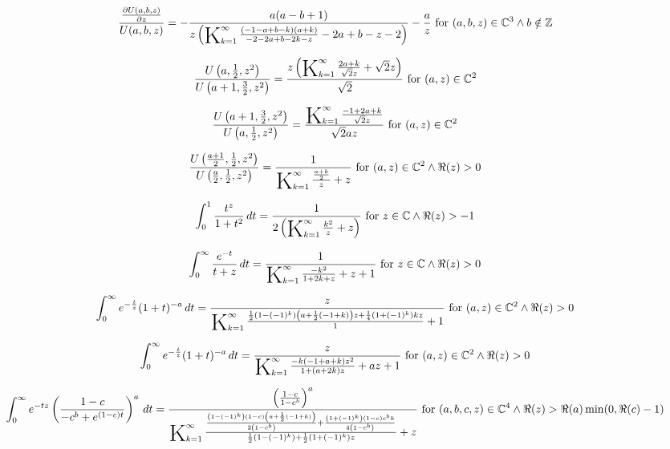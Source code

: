 \documentclass{article}
\newcommand{\bigK}{\mathop{\raisebox{-5pt}{\huge K}}}
\begin{document}
\[\frac{\frac{\partial U(a,b,z)}{\partial z}}{U(a,b,z)}=-\frac{a (a-b+1)}{z \left(\bigK_{k=1}^{\infty}\frac{(-1-a+b-k) (a+k)}{-2-2 a+b-2 k-z}-2 a+b-z-2\right)}-\frac{a}{z}\text{ for }(a,b,z)\in \mathbb{C}^3\land b\notin \mathbb{Z}\] 

\[\frac{U\left(a,\frac{1}{2},z^2\right)}{U\left(a+1,\frac{3}{2},z^2\right)}=\frac{z \left(\bigK_{k=1}^{\infty}\frac{2 a+k}{\sqrt{2} z}+\sqrt{2} z\right)}{\sqrt{2}}\text{ for }(a,z)\in \mathbb{C}^2\] 

\[\frac{U\left(a+1,\frac{3}{2},z^2\right)}{U\left(a,\frac{1}{2},z^2\right)}=\frac{\bigK_{k=1}^{\infty}\frac{-1+2 a+k}{\sqrt{2} z}}{\sqrt{2} a z}\text{ for }(a,z)\in \mathbb{C}^2\] 

\[\frac{U\left(\frac{a+1}{2},\frac{1}{2},z^2\right)}{U\left(\frac{a}{2},\frac{1}{2},z^2\right)}=\frac{1}{\bigK_{k=1}^{\infty}\frac{\frac{a+k}{2}}{z}+z}\text{ for }(a,z)\in \mathbb{C}^2\land \Re(z)>0\] 

\[\int_0^1 \frac{t^z}{1+t^2} \, dt=\frac{1}{2 \left(\bigK_{k=1}^{\infty}\frac{k^2}{z}+z\right)}\text{ for }z\in \mathbb{C}\land \Re(z)>-1\] 

\[\int_0^{\infty } \frac{e^{-t}}{t+z} \, dt=\frac{1}{\bigK_{k=1}^{\infty}\frac{-k^2}{1+2 k+z}+z+1}\text{ for }z\in \mathbb{C}\land \Re(z)>0\] 

\[\int_0^{\infty } e^{-\frac{t}{z}} (1+t)^{-a} \, dt=\frac{z}{\bigK_{k=1}^{\infty}\frac{\frac{1}{2} \left(1-(-1)^k\right) \left(a+\frac{1}{2} (-1+k)\right) z+\frac{1}{4} \left(1+(-1)^k\right) k z}{1}+1}\text{ for }(a,z)\in \mathbb{C}^2\land \Re(z)>0\] 

\[\int_0^{\infty } e^{-\frac{t}{z}} (1+t)^{-a} \, dt=\frac{z}{\bigK_{k=1}^{\infty}\frac{-k (-1+a+k) z^2}{1+(a+2 k) z}+a z+1}\text{ for }(a,z)\in \mathbb{C}^2\land \Re(z)>0\] 

\[\int_0^{\infty } e^{-t z} \left(\frac{1-c}{-c^b+e^{(1-c) t}}\right)^a \, dt=\frac{\left(\frac{1-c}{1-c^b}\right)^a}{\bigK_{k=1}^{\infty}\frac{\frac{\left(1-(-1)^k\right) (1-c) \left(a+\frac{1}{2} (-1+k)\right)}{2 \left(1-c^b\right)}+\frac{\left(1+(-1)^k\right) (1-c) c^b k}{4 \left(1-c^b\right)}}{\frac{1}{2} \left(1-(-1)^k\right)+\frac{1}{2} \left(1+(-1)^k\right) z}+z}\text{ for }(a,b,c,z)\in \mathbb{C}^4\land \Re(z)>\Re(a) \min (0,\Re(c)-1)\] 
\end{document}
